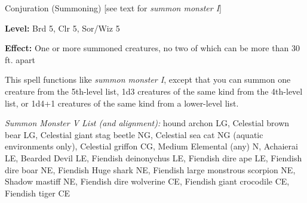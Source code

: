 
Conjuration (Summoning) [see text for \textit{summon monster I}]

\textbf{Level:} Brd 5, Clr 5, Sor/Wiz 5

\textbf{Effect:} One or more summoned creatures, no two of which can be more than 
30 ft. apart

This spell functions like \textit{summon monster I}, except that you can summon 
one creature from the 5th-level list, 1d3 creatures of the same kind from the 4th-level 
list, or 1d4+1 creatures of the same kind from a lower-level list.

\textit{Summon Monster V List (and alignment):} hound archon LG, Celestial brown bear LG, Celestial giant stag beetle NG, Celestial sea cat NG (aquatic environments only), Celestial griffon CG, Medium Elemental (any) N, Achaierai LE, Bearded Devil LE, Fiendish deinonychus LE, Fiendish dire ape LE, Fiendish dire boar NE, Fiendish Huge shark NE, Fiendish large monstrous scorpion NE, Shadow mastiff NE, Fiendish dire wolverine CE, Fiendish giant crocodile CE, Fiendish tiger CE

